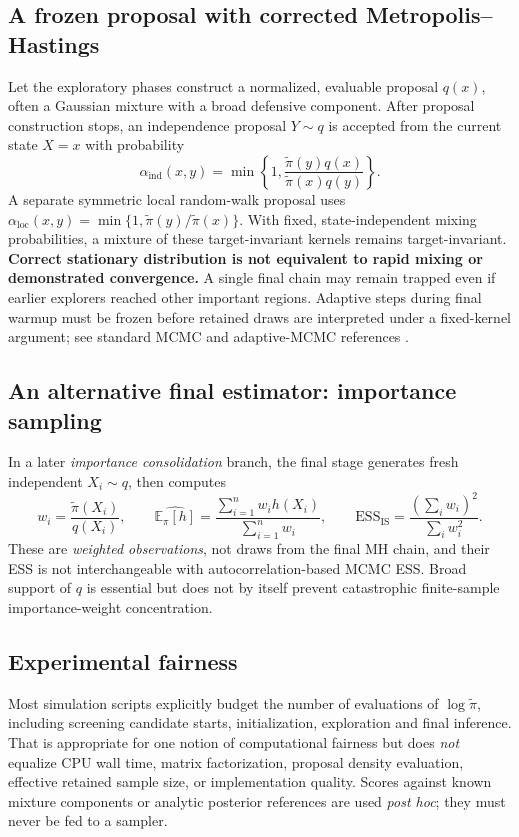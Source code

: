 \documentclass[11pt,letterpaper]{article}
\begin{document}
\subsection{A frozen proposal with corrected Metropolis--Hastings}
Let the exploratory phases construct a normalized, evaluable proposal \(q(x)\), often a Gaussian mixture with a broad defensive component. After proposal construction stops, an independence proposal \(Y\sim q\) is accepted from the current state \(X=x\) with probability
\begin{equation}\label{eq:imh}
\alpha_{\mathrm{ind}}(x,y)=\min\left\{1,\frac{\widetilde\pi(y)q(x)}{\widetilde\pi(x)q(y)}\right\}.
\end{equation}
A separate symmetric local random-walk proposal uses
\(\alpha_{\mathrm{loc}}(x,y)=\min\{1,\widetilde\pi(y)/\widetilde\pi(x)\}\).
With fixed, state-independent mixing probabilities, a mixture of these target-invariant kernels remains target-invariant. \textbf{Correct stationary distribution is not equivalent to rapid mixing or demonstrated convergence.} A single final chain may remain trapped even if earlier explorers reached other important regions. Adaptive steps during final warmup must be frozen before retained draws are interpreted under a fixed-kernel argument; see standard MCMC and adaptive-MCMC references \citep{robert2004,haario2001,roberts2007}.

\subsection{An alternative final estimator: importance sampling}
In a later \emph{importance consolidation} branch, the final stage generates fresh independent \(X_i\sim q\), then computes
\begin{equation}\label{eq:is}
w_i=\frac{\widetilde\pi(X_i)}{q(X_i)},\qquad
\widehat{\mathbb E_\pi[h]}=\frac{\sum_{i=1}^n w_i h(X_i)}{\sum_{i=1}^n w_i},\qquad
\mathrm{ESS}_{\mathrm{IS}}=\frac{(\sum_i w_i)^2}{\sum_i w_i^2}.
\end{equation}
These are \emph{weighted observations}, not draws from the final MH chain, and their ESS is not interchangeable with autocorrelation-based MCMC ESS. Broad support of \(q\) is essential but does not by itself prevent catastrophic finite-sample importance-weight concentration.

\subsection{Experimental fairness}
Most simulation scripts explicitly budget the number of evaluations of \(\log\widetilde\pi\), including screening candidate starts, initialization, exploration and final inference. That is appropriate for one notion of computational fairness but does \emph{not} equalize CPU wall time, matrix factorization, proposal density evaluation, effective retained sample size, or implementation quality. Scores against known mixture components or analytic posterior references are used \emph{post hoc}; they must never be fed to a sampler.
\end{document}
